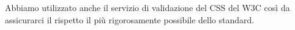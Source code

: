 Abbiamo utilizzato anche il servizio di validazione del CSS del W3C così da assicurarci il rispetto il più rigorosamente possibile dello standard.